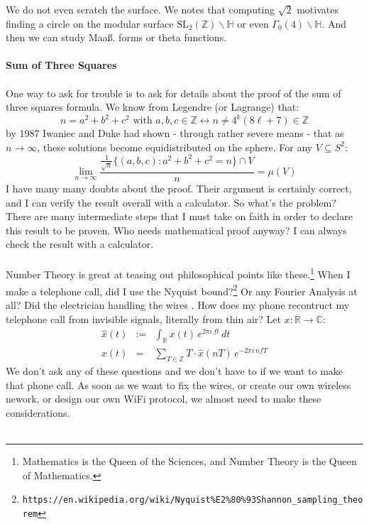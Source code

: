 \documentclass[12pt]{article}
\begin{document}
\newpage \noindent We do not even scratch the surface.  We notes that computing $\sqrt{2}$ motivates finding a circle on the modular surface $\text{SL}_2(\mathbb{Z}) \backslash \mathbb{H}$ or even $ \Gamma_0(4)\backslash \mathbb{H}$.  And then we can study Maa\ss. forms or theta functions. \\ \\
\textbf{Sum of Three Squares} \\ \\
One way to ask for trouble is to ask for details about the proof of the sum of three squares formula.  We know from Legendre (or Lagrange) that:
$$ n = a^2 + b^2 + c^2 \text{ with }a,b,c \in \mathbb{Z} \leftrightarrow n \neq 4^k(8\ell+7) \in \mathbb{Z} $$
by 1987 Iwaniec and Duke had shown - through rather severe means - that as $n \to \infty$, these solutions become equidistributed on the sphere.  For any $V \subseteq S^2$:
$$ \lim_{n \to \infty} \frac{\frac{1}{\sqrt{n}} \big\{ (a,b,c): a^2 + b^2 + c^2 = n  \big\} \cap V}{n} = \mu(V) $$
I have many many doubts about the proof.  Their argument is certainly correct, and I can verify the result overall with a calculator.  So what's the problem?  There are many intermediate steps that I must take on faith in order to declare this result to be proven.  Who needs mathematical proof anyway?  I can always check the result with a calculator.  \\ \\
Number Theory is great at teasing out philosophical points like these.\footnote{Mathematics is the Queen of the Sciences, and Number Theory is the Queen of Mathematics.}  When I make a telephone call, did I use the Nyquist bound?\footnote{\texttt{https://en.wikipedia.org/wiki/Nyquist\%E2\%80\%93Shannon\_sampling\_theorem}}  Or any Fourier Analysis at all?  Did the electrician handling the wires .  How does my phone recontruct my telephone call from invisible signals, literally from thin air? Let $x : \mathbb{R} \to \mathbb{C}$:
\begin{eqnarray*}
\hat{x}(t) &:=& \int_{\mathbb{R}} x(t) \,e^{2\pi i \, ft}\,dt \\ 
x(t) &=& \sum_{T \in \mathbb{Z}} T \cdot \hat{x}(nT) \, e^{-2\pi i \, n  f T}
\end{eqnarray*}
We don't ask any of these questions and we don't have to if we want to make that phone call.  As soon as we want to fix the wires, or create our own wireless nework, or design our own WiFi protocol, we almost need to make these considerations.
\\ \\
\end{document}
